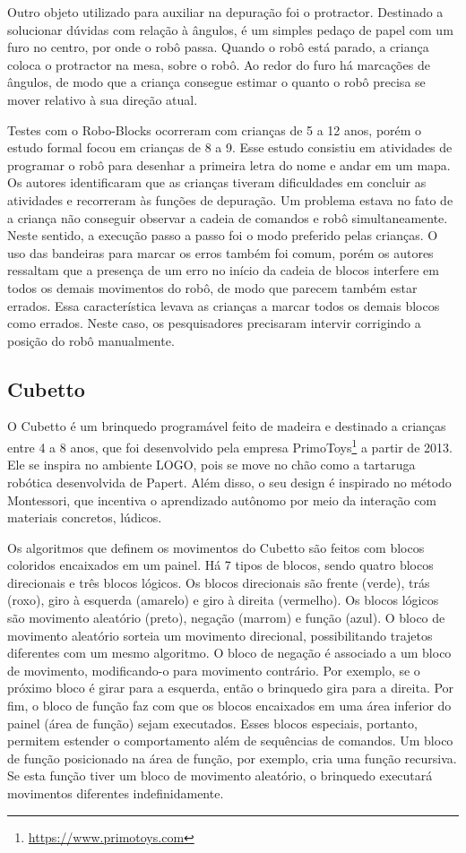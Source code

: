 Outro objeto utilizado para auxiliar na depuração foi o protractor. Destinado a solucionar dúvidas com relação à ângulos, é um simples pedaço de papel com um furo no centro, por onde o robô passa. Quando o robô está parado, a criança coloca o protractor na mesa, sobre o robô. Ao redor do furo há marcações de ângulos, de modo que a criança consegue estimar o quanto o robô precisa se mover relativo à sua direção atual.

Testes com o Robo-Blocks ocorreram com crianças de 5 a 12 anos, porém o estudo formal focou em crianças de 8 a 9. Esse estudo consistiu em atividades de programar o robô para desenhar a primeira letra do nome e andar em um mapa. Os autores identificaram que as crianças tiveram dificuldades em concluir as atividades e recorreram às funções de depuração. Um problema estava no fato de a criança não conseguir observar a cadeia de comandos e robô simultaneamente. Neste sentido, a execução passo a passo foi o modo preferido pelas crianças. O uso das bandeiras para marcar os erros também foi comum, porém os autores ressaltam que a presença de um erro no início da cadeia de blocos interfere em todos os demais movimentos do robô, de modo que parecem também estar errados. Essa característica levava as crianças a marcar todos os demais blocos como errados. Neste caso, os pesquisadores precisaram intervir corrigindo a posição do robô manualmente.

\subsection{Cubetto}
\label{sub_sec:cubetto}
O Cubetto é um brinquedo programável feito de madeira e destinado a crianças entre 4 a 8 anos, que foi desenvolvido pela empresa PrimoToys\footnote{\url{https://www.primotoys.com}} a partir de 2013. Ele se inspira no ambiente LOGO, pois se move no chão como a tartaruga robótica desenvolvida de Papert. Além disso, o seu design é inspirado no método Montessori, que incentiva o aprendizado autônomo por meio da interação com materiais concretos, lúdicos.

Os algoritmos que definem os movimentos do Cubetto são feitos com blocos coloridos encaixados em um painel. Há 7 tipos de blocos, sendo quatro blocos direcionais e três blocos lógicos. Os blocos direcionais são frente (verde), trás (roxo), giro à esquerda (amarelo) e giro à direita (vermelho). Os blocos lógicos são movimento aleatório (preto), negação (marrom) e função (azul). O bloco de movimento aleatório sorteia um movimento direcional, possibilitando trajetos diferentes com um mesmo algoritmo. O bloco de negação é associado a um bloco de movimento, modificando-o para movimento contrário. Por exemplo, se o próximo bloco é girar para a esquerda, então o brinquedo gira para a direita. Por fim, o bloco de função faz com que os blocos encaixados em uma área inferior do painel (área de função) sejam executados. Esses blocos especiais, portanto, permitem estender o comportamento além de sequências de comandos. Um bloco de função posicionado na área de função, por exemplo, cria uma função recursiva. Se esta função tiver um bloco de movimento aleatório, o brinquedo executará movimentos diferentes indefinidamente.

